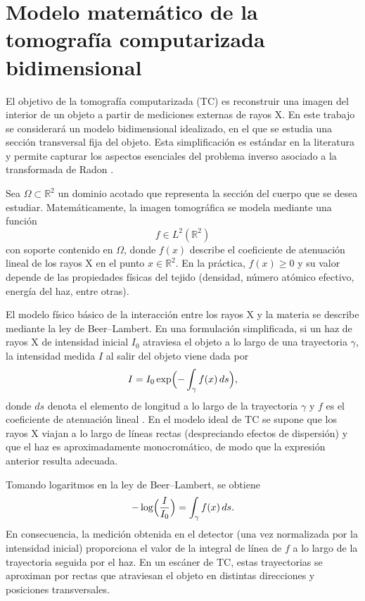 \section{Modelo matemático de la tomografía computarizada bidimensional}

El objetivo de la tomografía computarizada (TC) es reconstruir una imagen del interior de un objeto a partir de mediciones externas de rayos X. En este trabajo se considerará un modelo bidimensional idealizado, en el que se estudia una sección transversal fija del objeto. Esta simplificación es estándar en la literatura y permite capturar los aspectos esenciales del problema inverso asociado a la transformada de Radon \cite{kak_slaney1988,natterer2001,kuchment2014}.

Sea $\Omega \subset \mathbb{R}^{2}$ un dominio acotado que representa la sección del cuerpo que se desea estudiar. Matemáticamente, la imagen tomográfica se modela mediante una función
\[
f \in L^{2}(\mathbb{R}^{2})
\]
con soporte contenido en $\Omega$, donde $f(x)$ describe el coeficiente de atenuación lineal de los rayos X en el punto $x \in \mathbb{R}^{2}$. En la práctica, $f(x) \ge 0$ y su valor depende de las propiedades físicas del tejido (densidad, número atómico efectivo, energía del haz, entre otras).

El modelo físico básico de la interacción entre los rayos X y la materia se describe mediante la ley de Beer--Lambert. En una formulación simplificada, si un haz de rayos X de intensidad inicial $I_{0}$ atraviesa el objeto a lo largo de una trayectoria $\gamma$, la intensidad medida $I$ al salir del objeto viene dada por
\[
I = I_{0} \exp\Bigl(- \int_{\gamma} f(x)\, ds \Bigr),
\]
donde $ds$ denota el elemento de longitud a lo largo de la trayectoria $\gamma$ y $f$ es el coeficiente de atenuación lineal \cite{barrett_swindell1996,barrett_myers2013}. En el modelo ideal de TC se supone que los rayos X viajan a lo largo de líneas rectas (despreciando efectos de dispersión) y que el haz es aproximadamente monocromático, de modo que la expresión anterior resulta adecuada.

Tomando logaritmos en la ley de Beer--Lambert, se obtiene
\[
- \log\Bigl( \frac{I}{I_{0}} \Bigr) = \int_{\gamma} f(x)\, ds.
\]
En consecuencia, la medición obtenida en el detector (una vez normalizada por la intensidad inicial) proporciona el valor de la integral de línea de $f$ a lo largo de la trayectoria seguida por el haz. En un escáner de TC, estas trayectorias se aproximan por rectas que atraviesan el objeto en distintas direcciones y posiciones transversales.

